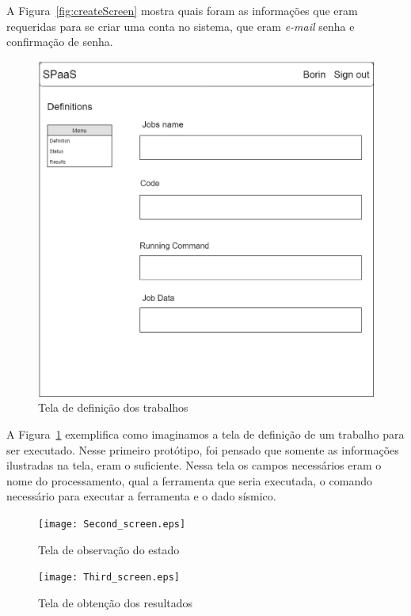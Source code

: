 \documentclass[11pt,twoside]{article}
\begin{document}
A Figura~\ref{fig:createScreen} mostra quais foram as informações que eram requeridas para se criar uma conta no sistema, que eram \emph{e-mail} senha e confirmação de senha.

\begin{figure}[!h]
  \centering
  \includegraphics[scale=0.2]{First_screen.eps}
  \caption{Tela de definição dos trabalhos}
  \label{fig:definitionScreen}
\end{figure}

A Figura~\ref{fig:definitionScreen} exemplifica como imaginamos a tela de definição de um trabalho para ser executado. Nesse primeiro protótipo, foi pensado que somente 
as informações ilustradas na tela, eram o suficiente. Nessa tela os campos necessários eram o nome do processamento, qual a ferramenta que seria executada, o comando necessário para executar
a ferramenta e o dado sísmico.

\begin{figure}[!h]
  \centering
  \texttt{[image: Second\_screen.eps]}
  \caption{Tela de observação do estado}
  \label{fig:statusScreen}
\end{figure}

\begin{figure}[!h]
  \centering
  \texttt{[image: Third\_screen.eps]}
  \caption{Tela de obtenção dos resultados}
  \label{fig:resultsScreen}
\end{figure}
\end{document}
